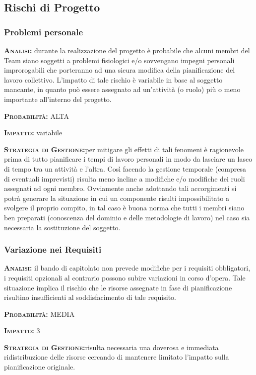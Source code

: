\subsection{Rischi di Progetto}
\subsubsection{Problemi personale}
\begin{description}
	\item{\scshape\bfseries Analisi:} durante la realizzazione del progetto è probabile che alcuni membri del Team siano soggetti a problemi fisiologici e/o sovvengano impegni personali improrogabili che porteranno ad una sicura modifica della pianificazione del lavoro collettivo. L'impatto di tale rischio è variabile in base al soggetto mancante, in quanto può essere assegnato ad un'attività (o ruolo) più o meno importante all'interno del progetto.
	\item{\scshape\bfseries Probabilità:} ALTA
	\item{\scshape\bfseries Impatto:} variabile
	\item{\scshape\bfseries Strategia di Gestione:}per mitigare gli effetti di tali fenomeni è ragionevole prima di tutto pianificare i tempi di lavoro personali in modo da lasciare un lasco di tempo tra un attività e l'altra. Così facendo la gestione temporale (compresa di eventuali imprevisti) risulta meno incline a modifiche e/o modifiche dei ruoli assegnati ad ogni membro. Ovviamente anche adottando tali accorgimenti si potrà generare la situazione in cui un componente risulti impossibilitato a svolgere il proprio compito, in tal caso è buona norma che tutti i membri siano ben preparati (conoscenza del dominio e delle metodologie di lavoro) nel caso sia necessaria la sostituzione del soggetto.
\end{description}

\subsubsection{Variazione nei Requisiti}
\begin{description}
	\item{\scshape\bfseries Analisi:} il bando di capitolato non prevede modifiche per i requisiti obbligatori, i requisiti opzionali al contrario possono subire variazioni in corso d'opera. Tale situazione implica il rischio che le risorse assegnate in fase di pianificazione risultino insufficienti al soddisfacimento di tale requisito.
	\item{\scshape\bfseries Probabilità:} MEDIA
	\item{\scshape\bfseries Impatto:} 3
	\item{\scshape\bfseries Strategia di Gestione:}risulta necessaria una doverosa e immediata ridistribuzione delle risorse cercando di mantenere limitato l'impatto sulla pianificazione originale.
\end{description}

